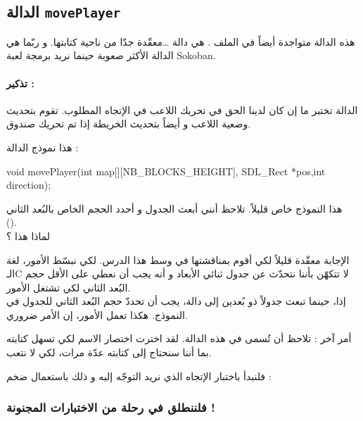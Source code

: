 \subsection{الدالة \texttt{movePlayer}}

هذه الدالة متواجدة أيضاً في الملف 
.
هي دالة \dots معقّدة جدّا من ناحية كتابتها. و ربّما هي الدالة الأكثر صعوبة حينما نريد برمجة لعبة
\textenglish{Sokoban}.

\paragraph{تذكير :}
الدالة
تختبر ما إن كان لدينا الحق في تحريك اللاعب في الإتجاه المطلوب. تقوم بتحديث وضعية اللاعب
و أيضاً بتحديث الخريطة إذا تم تحريك صندوق.

هذا نموذج الدالة :

\begin{Csource}
void movePlayer(int map[][NB_BLOCKS_HEIGHT], SDL_Rect *pos,int direction);
\end{Csource}

هذا النموذج خاص قليلاً. تلاحظ أنني أبعث الجدول
و أحدد الحجم الخاص بالبُعد الثاني\\
().\\
لماذا هذا ؟

الإجابة معقّدة قليلاً لكي أقوم بمناقشتها في وسط هذا الدرس. لكي نبسّط الأمور، لغة الـ\textenglish{C}
لا تتكهّن بأننا نتحدّث عن جدول ثنائي الأبعاد و أنه يجب أن نعطي على الأقل حجم البُعد الثاني لكي تشتغل الأمور.\\
إذا، حينما تبعث جدولاً ذو بُعدين إلى دالة، يجب أن تحددّ حجم البُعد الثاني للجدول في النموذج. هكذا تعمل الأمور، إن الأمر ضروري.

أمر آخر : تلاحظ أن
تُسمى 
في هذه الدالة. لقد اخترت اختصار الاسم لكي تسهل كتابته بما أننا سنحتاج إلى كتابته عدّة مرات، لكي لا نتعب.

فلنبدأ باختبار الإتجاه الذي نريد التوجّه إليه و ذلك باستعمال
ضخم :

\begin{Csource}
switch(direction)
{
	case UP:
	/* etc */
\end{Csource}

\subsubsection{فلننطلق في رحلة من الاختبارات المجنونة !}


